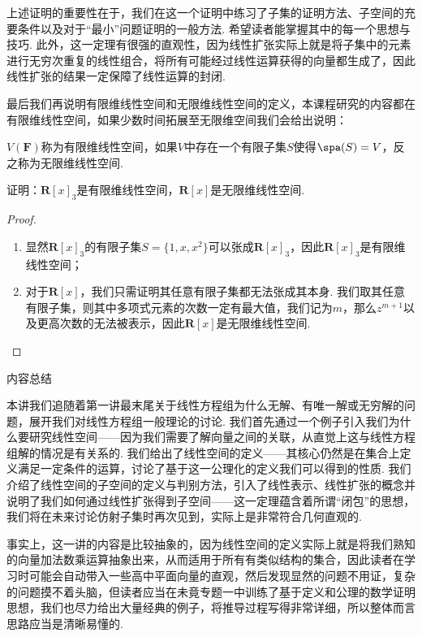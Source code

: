 上述证明的重要性在于，我们在这一个证明中练习了子集的证明方法、子空间的充要条件以及对于``最小''问题证明的一般方法. 希望读者能掌握其中的每一个思想与技巧. 此外，这一定理有很强的直观性，因为线性扩张实际上就是将子集中的元素进行无穷次重复的线性组合，将所有可能经过线性运算获得的向量都生成了，因此线性扩张的结果一定保障了线性运算的封闭.

最后我们再说明有限维线性空间和无限维线性空间的定义，本课程研究的内容都在有限维线性空间，如果少数时间拓展至无限维空间我们会给出说明：
\begin{definition}
    $V(\mathbf{F})$称为有限维线性空间，如果$V$中存在一个有限子集$S$使得$\spa(S)=V$，反之称为无限维线性空间.
\end{definition}

\begin{example}
    证明：$\mathbf{R}[x]_3$是有限维线性空间，$\mathbf{R}[x]$是无限维线性空间.
\end{example}

\begin{proof}
    \begin{enumerate}
        \item 显然$\mathbf{R}[x]_3$的有限子集$S=\{1,x,x^2\}$可以张成$\mathbf{R}[x]_3$，因此$\mathbf{R}[x]_3$是有限维线性空间；

        \item 对于$\mathbf{R}[x]$，我们只需证明其任意有限子集都无法张成其本身. 我们取其任意有限子集，则其中多项式元素的次数一定有最大值，我们记为$m$，那么$z^{m+1}$以及更高次数的无法被表示，因此$\mathbf{R}[x]$是无限维线性空间.
    \end{enumerate}
\end{proof}

\vspace{2ex}
\centerline{\heiti \Large 内容总结}

本讲我们追随着第一讲最末尾关于线性方程组为什么无解、有唯一解或无穷解的问题，展开我们对线性方程组一般理论的讨论. 我们首先通过一个例子引入我们为什么要研究线性空间——因为我们需要了解向量之间的关联，从直觉上这与线性方程组解的情况是有关系的. 我们给出了线性空间的定义——其核心仍然是在集合上定义满足一定条件的运算，讨论了基于这一公理化的定义我们可以得到的性质. 我们介绍了线性空间的子空间的定义与判别方法，引入了线性表示、线性扩张的概念并说明了我们如何通过线性扩张得到子空间——这一定理蕴含着所谓``闭包''的思想，我们将在未来讨论仿射子集时再次见到，实际上是非常符合几何直观的.

事实上，这一讲的内容是比较抽象的，因为线性空间的定义实际上就是将我们熟知的向量加法数乘运算抽象出来，从而适用于所有有类似结构的集合，因此读者在学习时可能会自动带入一些高中平面向量的直观，然后发现显然的问题不用证，复杂的问题摸不着头脑，但读者应当在未竟专题一中训练了基于定义和公理的数学证明思想，我们也尽力给出大量经典的例子，将推导过程写得非常详细，所以整体而言思路应当是清晰易懂的.

